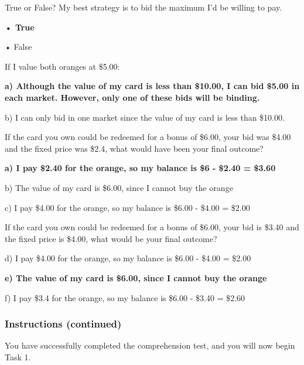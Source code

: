 \documentclass[12pt]{article}
\begin{document}
\vspace{0.5cm}



True or False? My best strategy is to bid the maximum I'd be willing to pay.  

\textbf{• True}  \par
• False 

\vspace{0.5cm}

If I value both oranges at \$5.00:

\textbf{a) Although the value of my card is less than \$10.00, I can bid \$5.00 in each market. However, only one of these bids will be binding.}  

b) I can only bid in one market since the value of my card is less than \$10.00.  

\vspace{0.5cm}

If the card you own could be redeemed for a bonus of \$6.00, your bid was \$4.00 and the fixed price was \$2.4, what would have been your final outcome?  

\textbf{a) I pay \$2.40 for the orange, so my balance is \$6 - \$2.40 = \$3.60 } 

b) The value of my card is \$6.00, since I cannot buy the orange  

c) I pay \$4.00 for the orange, so my balance is \$6.00 - \$4.00 = \$2.00  

\vspace{0.5cm}

If the card you own could be redeemed for a bonus of \$6.00, your bid is \$3.40 and the fixed price is \$4.00, what would be your final outcome?  

d) I pay \$4.00 for the orange, so my balance is \$6.00 - \$4.00 = \$2.00  

\textbf{e) The value of my card is \$6.00, since I cannot buy the orange } 

f) I pay \$3.4 for the orange, so my balance is \$6.00 - \$3.40 = \$2.60  

\vspace{0.5cm}

\subsubsection*{\textbf{Instructions (continued)}}

You have successfully completed the comprehension test, and you will now begin Task 1.\par
\end{document}
